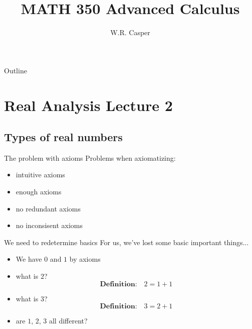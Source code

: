 \documentclass{beamer}
\title{MATH 350 Advanced Calculus}
\subtitle
{} %
\author[W.R. Casper] %
{W.R. Casper}
\institute[California State University Fullerton] %
{
  Department of Mathematics\\
  California State University Fullerton}
\begin{document}
\begin{frame}
  \titlepage
\end{frame}

\begin{frame}{Outline}
  \tableofcontents
\end{frame}



\section{Real Analysis Lecture 2}


\subsection{Types of real numbers}

\begin{frame}{The problem with axioms}
Problems when axiomatizing:
\begin{itemize}
\pause
\item intuitive axioms
\pause
\item enough axioms
\pause
\item no redundant axioms
\pause
\item no inconsisent axioms
\end{itemize}
\end{frame}

\begin{frame}{We need to redetermine basics}
For us, we've lost some basic important things...
\begin{itemize}
\item We have $0$ and $1$ {\color{red}by axioms}
\pause
\item what is $2$?
\pause
$$\textbf{Definition:}\quad 2 = 1+1$$
\pause
\item what is $3$?
\pause
$$\textbf{Definition:}\quad 3 = 2+1$$
\pause
\item are $1$, $2$, $3$ all different?
\end{itemize}
\end{frame}
\end{document}
